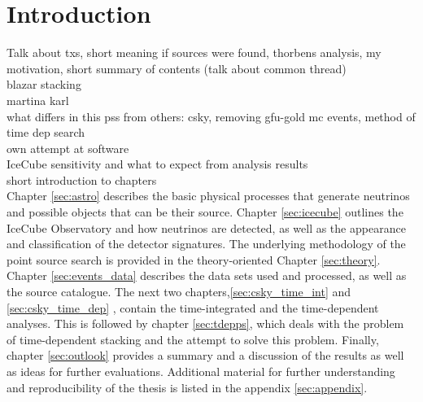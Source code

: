 \chapter{Introduction}
Talk about txs, short meaning if sources were found, thorbens analysis, my motivation, short summary of contents (talk about common thread)\\

blazar stacking\\
martina karl\\
what differs in this pss from others: csky, removing gfu-gold mc events, method of time dep search\\
own attempt at software\\
IceCube sensitivity and what to expect from analysis results\\
short introduction to chapters\\

Chapter \ref{sec:astro} describes the basic physical processes that generate neutrinos and possible objects that can be their source.
Chapter \ref{sec:icecube} outlines the IceCube Observatory and how neutrinos are detected, as well as the appearance and classification of the detector signatures.
The underlying methodology of the point source search is provided in the theory-oriented Chapter \ref{sec:theory}.
Chapter \ref{sec:events_data} describes the data sets used and processed, as well as the source catalogue.
The next two chapters,\ref{sec:csky_time_int} and \ref{sec:csky_time_dep} , contain the time-integrated and the time-dependent analyses.
This is followed by chapter \ref{sec:tdepps}, which deals with the problem of time-dependent stacking and the attempt to solve this problem.
Finally, chapter \ref{sec:outlook} provides a summary and a discussion of the results as well as ideas for further evaluations.
Additional material for further understanding and reproducibility of the thesis is listed in the appendix \ref{sec:appendix}.
